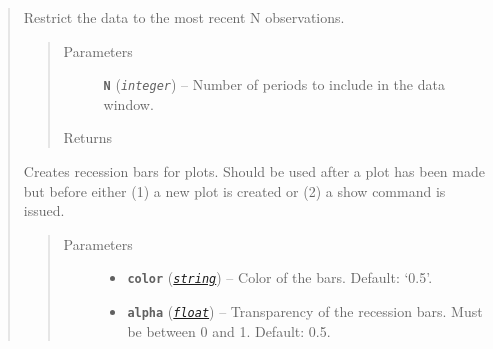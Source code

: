 \documentclass[letterpaper,10pt,openany,oneside]{sphinxmanual}
\begin{document}
\begin{fulllineitems}
\begin{quote}
\begin{fulllineitems}
\begin{quote}
\begin{description}
\end{description}\end{quote}

\end{fulllineitems}


\begin{fulllineitems}
\label{series_class:fredpy.series.recent}
Restrict the data to the most recent N observations.
\begin{quote}\begin{description}
\item[{Parameters}] \leavevmode
\textbf{\texttt{N}} (\emph{\texttt{integer}}) -- Number of periods to include in the data window.

\item[{Returns}] \leavevmode
{\hyperref[series_class:fredpy.series]{}}

\end{description}\end{quote}

\end{fulllineitems}


\begin{fulllineitems}
\label{series_class:fredpy.series.recessions}
Creates recession bars for plots. Should be used after a plot has been made but before either (1) a new plot is created or (2) a show command is issued.
\begin{quote}\begin{description}
\item[{Parameters}] \leavevmode\begin{itemize}
\item {} 
\textbf{\texttt{color}} (\href{https://docs.python.org/library/string.html\#module-string}{\emph{\texttt{string}}}) -- Color of the bars. Default: `0.5'.

\item {} 
\textbf{\texttt{alpha}} (\href{https://docs.python.org/library/functions.html\#float}{\emph{\texttt{float}}}) -- Transparency of the recession bars. Must be between 0 and 1. Default: 0.5.

\end{itemize}


\end{description}
\end{quote}
\end{fulllineitems}
\end{quote}
\end{fulllineitems}
\end{document}
